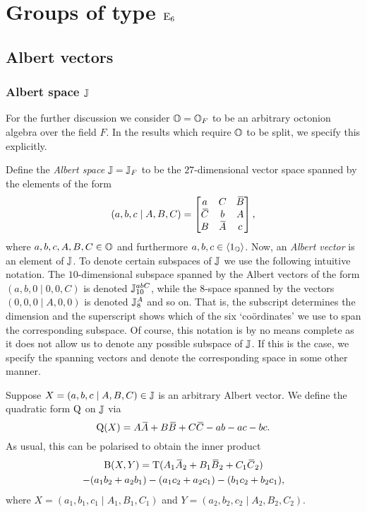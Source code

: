 \chapter{Groups of type $\mathord{\mathrm{E}}_6$}
\ifpdf
    \graphicspath{{Chapter2/Chapter2Figs/PNG/}{Chapter2/Chapter2Figs/PDF/}{Chapter2/Chapter2Figs/}}
\else
    \graphicspath{{Chapter2/Chapter2Figs/EPS/}{Chapter2/Chapter2Figs/}}
\fi

\label{chapter2}

\section{Albert vectors}

\subsection{Albert space $\mathbb{J}$}

For the further discussion we consider $\mathbb{O} = \mathbb{O}_F$ to be an arbitrary 
octonion algebra over the field $F$. In the results which require $\mathbb{O}$ to be split,
we specify this explicitly. 

Define the \textit{Albert space} $\mathbb{J}=\mathbb{J}_F$ to be 
the $27$-dimensional vector space spanned by the elements of the form
\begin{equation}
	(a,b,c\mid A,B,C) = \begin{bmatrix}
		a & C & \ovB \\
		\ovC & b & A \\
		B & \ovA & c
	\end{bmatrix},
\end{equation}
where $a,b,c,A,B,C \in \mathbb{O}$ and furthermore $a,b,c \in \langle 1_{\mathbb{O}} \rangle$. 
Now, an \textit{Albert vector} is an element of $\mathbb{J}$. To denote
certain subspaces of $\mathbb{J}$ we use the following intuitive notation. The $10$-dimensional
subspace spanned by the Albert vectors of the form \mbox{$(a,b,0\mid 0,0,C)$} is denoted
$\mathbb{J}_{10}^{abC}$, while the $8$-space spanned by the vectors \mbox{$(0,0,0\mid A,0,0)$} 
is denoted $\mathbb{J}_{8}^{A}$ and so on. That is, the subscript determines the dimension
and the superscript shows which of the six `co{\"o}rdinates' we use to span the
corresponding subspace. Of course, this notation is by no means complete as it does not
allow us to denote any possible subspace of $\mathbb{J}$. If this is the case, we specify 
the spanning vectors and denote the corresponding space in some other manner.

Suppose $X = (a,b,c \mid A,B,C) \in \mathbb{J}$ is an arbitrary Albert vector. We define
the quadratic form $\mathord{\mathrm{Q}}$ on $\mathbb{J}$ via
\begin{equation}
	\label{eq:qform_on_J}
	\QQ(X) = A\ovA + B\ovB + C\ovC - ab - ac - bc.
\end{equation}
As usual, this can be polarised to obtain the inner product
\begin{multline}
	\label{eq:inner_product_in_J}
	\BB(X,Y) = \Tr( A_1 \ovA_2 + B_1 \ovB_2 + C_1 \ovC_2 ) \\
		- (a_1 b_2 + a_2 b_1) - (a_1 c_2 + a_2 c_1) - (b_1 c_2 + b_2 c_1),
\end{multline}
where $X = (a_1, b_1, c_1 \mid A_1, B_1, C_1)$ and $Y = (a_2, b_2, c_2 \mid A_2, B_2, C_2 )$.


